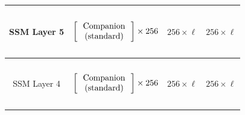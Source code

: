 \begin{table}[]
\begin{tabular}{@{}c|c|c|c@{}}
SSM Layer 5 & \begin{math}\begin{aligned}    \begin{matrix}    \text{\phantom{-}} \\    \end{matrix}    \\    \begin{bmatrix}    \text{\phantom{-} Companion \phantom{-}}  \\ \text{(standard)} \\    \end{bmatrix}    \times 256     \\    \begin{matrix}    \text{\phantom{-}} \\    \end{matrix}    \\\end{aligned}\end{math}                                                                                                                                                                                                                               & $256 \times \ell$ & $256 \times \ell$ \\ \midrule
SSM Layer 4 & \begin{math}\begin{aligned}    \begin{matrix}    \text{\phantom{-}} \\    \end{matrix}    \\    \begin{bmatrix}    \text{\phantom{-} Companion \phantom{-}}   \\ \text{(standard)} \\    \end{bmatrix}    \times 256     \\    \begin{matrix}    \text{\phantom{-}} \\    \end{matrix}    \\\end{aligned}\end{math}                                                                                                                                                                                                                               & $256 \times \ell$ & $256 \times \ell$ \\ \midrule

\end{tabular}
\end{table}
